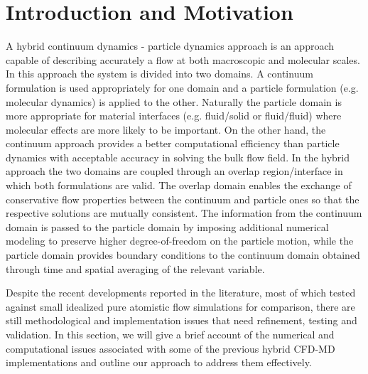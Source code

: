 \documentclass[preprint,12pt]{elsarticle}
\begin{document}


\section{Introduction and Motivation}
\label{sec:intro}

A hybrid continuum dynamics - particle dynamics approach is an approach 
capable of describing accurately a flow at both macroscopic and molecular scales. 
In this approach the system is divided into two domains. A continuum formulation is used
appropriately for one domain and a particle formulation (e.g. molecular dynamics) is applied to
the other.
Naturally the particle domain is more appropriate for material interfaces 
(e.g. fluid/solid or fluid/fluid) where molecular effects are more likely to be important. 
On the other hand, the continuum approach provides a better computational efficiency than
particle dynamics with acceptable accuracy in solving the bulk flow field.
In the hybrid approach the two domains are coupled through an overlap region/interface 
in which both formulations are valid. The overlap domain enables the exchange of 
conservative flow properties between the continuum and particle ones so that 
the respective solutions are mutually consistent. 
The information from the continuum domain is passed to the particle domain 
by imposing additional numerical modeling to preserve higher degree-of-freedom 
on the particle motion, while the particle domain provides boundary conditions 
to the continuum domain obtained through time and spatial averaging of the relevant variable.

Despite the recent developments reported in the literature, most of which tested 
against small idealized pure atomistic flow simulations for comparison, 
there are still methodological and implementation issues that need refinement, 
testing and validation. In this section, we will give a brief account of the numerical and 
computational issues associated with some of the previous hybrid CFD-MD implementations 
and outline our approach to address them effectively.
\end{document}
